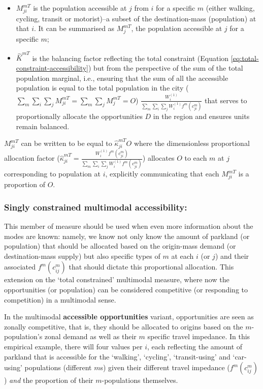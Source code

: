 \documentclass[
11pt, %
oneside, %
english, %
singlespacing, %
]{macthesis} %
\def\tightlist{}
\begin{document}
\begin{itemize}
\tightlist
\item
  \(M^{mT}_{ji}\) is the population accessible at \(j\) from \(i\) for a specific \(m\) (either walking, cycling, transit or motorist)--a subset of the destination-mass (population) at that \(i\). It can be summarised as \(M^{mT}_{j}\), the population accessible at \(j\) for a specific \(m\);
\item
  \(\hat K^{mT}\) is the balancing factor reflecting the total constraint (Equation \ref{eq:total-constraint-accessibility}) but from the perspective of the sum of the total population marginal, i.e., ensuring that the sum of all the accessible population is equal to the total population in the city (\(\sum_m \sum_i\sum_j M^{mT}_{ji} = \sum_m \sum_j M^{mT}_{j} = O\)) \(\frac{W^{(1)}_i}{\sum_m\sum_i\sum_j W^{(1)}_if^m(c^m_{ji})}\) that serves to proportionally allocate the opportunities \(D\) in the region and ensures units remain balanced.
\end{itemize}

\(M_{ji}^{mT}\) can be written to be equal to \(\hat \kappa_{ji}^{mT} O\) where the dimensionless proportional allocation factor (\(\hat \kappa_{ji}^{mT} = \frac{W_i^{(1)} f^m(c^m_{ji})}{\sum_m\sum_i\sum_j W^{(1)}_if^m(c^m_{ji})}\)) allocates \(O\) to each \(m\) at \(j\) corresponding to population at \(i\), explicitly communicating that each \(M_{ji}^{mT}\) is a proportion of \(O\).

\subsubsection{Singly constrained multimodal accessibility:}\label{singly-constrained-multimodal-accessibility}

This member of measure should be used when even more information about the modes are known: namely, we know not only know the amount of parkland (or population) that should be allocated based on the origin-mass demand (or destination-mass supply) but also specific types of \(m\) at each \(i\) (or \(j\)) and their associated \(f^m(c^m_{ij})\) that should dictate this proportional allocation. This extension on the `total constrained' multimodal measure, where now the opportunities (or population) can be considered competitive (or responding to competition) in a multimodal sense.

In the multimodal \textbf{accessible opportunities} variant, opportunities are seen as zonally competitive, that is, they should be allocated to origins based on the \(m\)-population's zonal demand as well as their \(m\) specific travel impedance. In this empirical example, there will four values per \(i\), each reflecting the amount of parkland that is accessible for the `walking', `cycling', `transit-using' and `car-using' populations (different \(m\)s) given their different travel impedance (\(f^m(c^m_{ij})\)) \emph{and} the proportion of their \(m\)-populations themselves.
\end{document}
